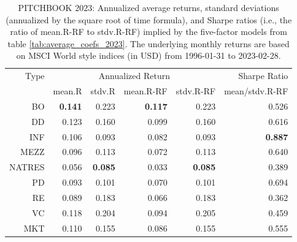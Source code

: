 \documentclass[12pt]{article}
\begin{document}
\begin{table}[ht]
	\centering
	\begin{tabular}{rrrrrr}
		Type & \multicolumn{4}{c}{Annualized Return} & Sharpe Ratio \\ 
		\cmidrule(r){2-5}
		& mean.R & stdv.R & mean.R-RF & stdv.R-RF & mean/stdv.R-RF \\ 
		\hline
		\hline
		BO & \textbf{0.141} & 0.223 & \textbf{0.117} & 0.223 & 0.526 \\ 
		DD & 0.123 & 0.160 & 0.099 & 0.160 & 0.616 \\ 
		INF & 0.106 & 0.093 & 0.082 & 0.093 & \textbf{0.887} \\ 
		MEZZ & 0.096 & 0.113 & 0.072 & 0.113 & 0.640 \\ 
		NATRES & 0.056 & \textbf{0.085} & 0.033 & \textbf{0.085} & 0.389 \\ 
		PD & 0.093 & 0.101 & 0.070 & 0.101 & 0.694 \\ 
		RE & 0.089 & 0.183 & 0.066 & 0.183 & 0.362 \\ 
		VC & 0.118 & 0.204 & 0.094 & 0.205 & 0.459 \\ 
			\hline
		MKT & 0.110 & 0.155 & 0.086 & 0.155 & 0.555 \\ 
		\hline
		\hline
	\end{tabular}
	\caption{
		PITCHBOOK 2023: 
		Annualized average returns, standard deviations (annualized by the square root of time formula), and Sharpe ratios (i.e., the ratio of mean.R-RF to stdv.R-RF) implied by the five-factor models from table \ref{tab:average_coefs_2023}. 
	The underlying monthly returns are based on MSCI World style indices (in USD) from 1996-01-31 to 2023-02-28.} 
	\label{tab:ann_returns_2023}
\end{table}
\end{document}
